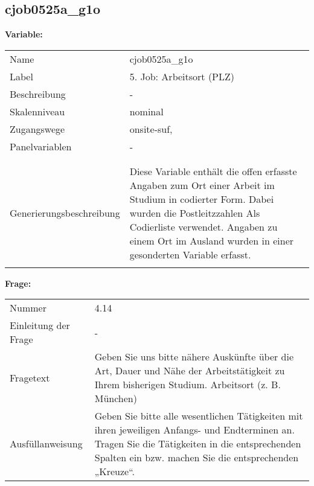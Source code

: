 	
	
	\subsection{cjob0525a\_g1o}
	\label{subSection:cjob0525a_g1o}

	\noindent\textbf{Variable:}\\
		\begin{tabular}{lL{11.3cm}}
			\label{tableVariable:cjob0525a_g1o}
			Name & cjob0525a\_g1o \\
			Label & 5. Job: Arbeitsort (PLZ) \\
			Beschreibung & - \\
			Skalenniveau & nominal \\
			Zugangswege &
				onsite-suf,
 \\
			Panelvariablen & -
			 \\
			 \\
 \\
					Generierungsbeschreibung & Diese Variable enthält die offen erfasste Angaben zum Ort einer Arbeit im Studium in codierter Form. Dabei wurden die Postleitzzahlen Als Codierliste verwendet. Angaben zu einem Ort im Ausland wurden in einer gesonderten Variable erfasst. 
				 \\	
			 \\
		\end{tabular}

		\vspace*{1 cm}
		\noindent\textbf{Frage:}\\
		\begin{tabular}{lL{11.3cm}}
			\label{tableQuestion:cjob0525a_g1o}
			Nummer & 4.14 \\
			Einleitung der Frage & - \\
			Fragetext & Geben Sie uns bitte nähere Auskünfte über die Art, Dauer und Nähe der Arbeitstätigkeit zu Ihrem bisherigen Studium.
Arbeitsort
(z. B. München) \\
			Ausfüllanweisung & Geben Sie bitte alle wesentlichen Tätigkeiten mit ihren jeweiligen Anfangs- und Endterminen an. Tragen Sie die Tätigkeiten in die entsprechenden Spalten ein bzw. machen Sie die entsprechenden „Kreuze“. \\
		\end{tabular}





